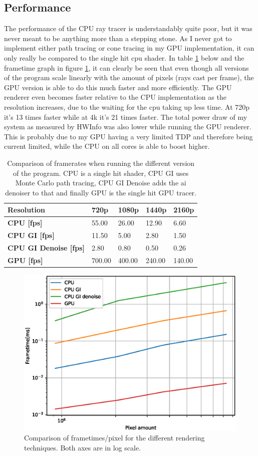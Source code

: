 \subsection*{Performance}
The performance of the CPU ray tracer is understandably quite poor, but it was never meant to be anything more than a stepping stone. As I never got to implement either path tracing or cone tracing in my GPU implementation, it can only really be compared to the single hit cpu shader. In table \ref{tab:performance} below and the frametime graph in figure \ref{fig:times}, it can clearly be seen that even though all versions of the program scale linearly with the amount of pixels (rays cast per frame), the GPU version is able to do this much faster and more efficiently. The GPU renderer even becomes faster relative to the CPU implementation as the resolution increases, due to the waiting for the cpu taking up less time. At 720p it's 13 times faster while at 4k it's 21 times faster. The total power draw of my system as measured by HWInfo was also lower while running the GPU renderer. This is probably due to my GPU having a very limited TDP and therefore being current limited, while the CPU on all cores is able to boost higher. 
\begin{table}
	\begin{tabular}{lllll}
		\textbf{Resolution}               & 720p   & 1080p  & 1440p  & 2160p  \\ \hline
		\textbf{CPU {[}fps{]}}            & 55.00  & 26.00  & 12.90  & 6.60   \\
		\textbf{CPU GI {[}fps{]}}         & 11.50  & 5.00   & 2.80   & 1.50   \\
		\textbf{CPU GI Denoise {[}fps{]}} & 2.80   & 0.80   & 0.50   & 0.26   \\
		\textbf{GPU {[}fps{]}}            & 700.00 & 400.00 & 240.00 & 140.00
	\end{tabular}
	\caption{Comparison of framerates when running the different version of the program. CPU is a single hit shader, CPU GI uses Monte Carlo path tracing, CPU GI Denoise adds the ai denoiser to that and finally GPU is the single hit GPU tracer.}
	\label{tab:performance}
\end{table}
\begin{figure}
	\centering
	\includegraphics[width=0.8\linewidth]{times}
	\caption{Comparison of frametimes/pixel for the different rendering techniques. Both axes are in log scale.}
	\label{fig:times}
\end{figure}
